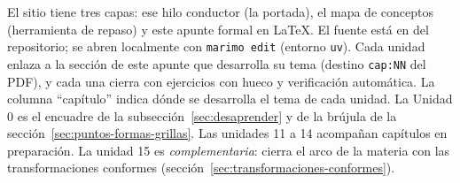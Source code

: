 El sitio tiene tres capas: ese hilo conductor (la portada), el mapa de conceptos
(herramienta de repaso) y este apunte formal en \LaTeX{}. El fuente está en
 del repositorio; se abren localmente con \texttt{marimo edit}
(entorno \texttt{uv}). Cada unidad enlaza a la sección de este apunte que desarrolla su
tema (destino \texttt{cap:NN} del PDF), y cada una cierra con ejercicios con hueco y
verificación automática. La columna ``capítulo'' indica dónde se desarrolla el tema de cada unidad. La Unidad 0 es el
encuadre de la subsección~\ref{sec:desaprender} y de la brújula de la
sección~\ref{sec:puntos-formas-grillas}. Las unidades 11 a 14 acompañan capítulos en preparación. La unidad 15 es \emph{complementaria}: cierra el arco de la materia con las
transformaciones conformes (sección~\ref{sec:transformaciones-conformes}).


